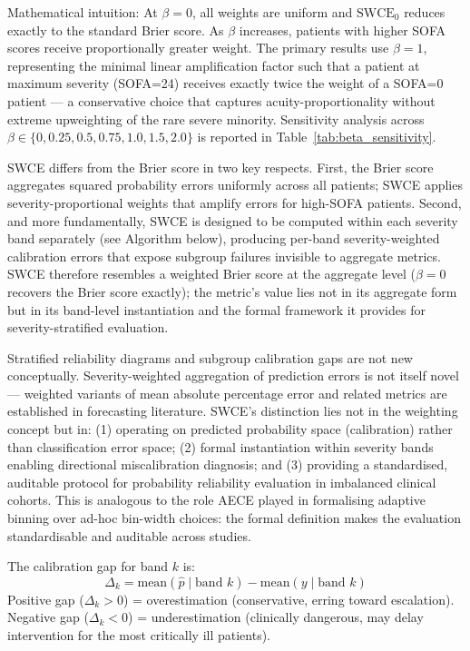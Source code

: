 \documentclass{ieeeaccess}
\begin{document}
Mathematical intuition: At $\beta=0$, all weights are uniform and $\text{SWCE}_0$ reduces exactly to the standard Brier score. As $\beta$ increases, patients with higher SOFA scores receive proportionally greater weight. The primary results use $\beta=1$, representing the minimal linear amplification factor such that a patient at maximum severity (SOFA=24) receives exactly twice the weight of a SOFA=0 patient — a conservative choice that captures acuity-proportionality without extreme upweighting of the rare severe minority. Sensitivity analysis across $\beta \in \{0, 0.25, 0.5, 0.75, 1.0, 1.5, 2.0\}$ is reported in Table~\ref{tab:beta_sensitivity}.

SWCE differs from the Brier score in two key respects. First, the Brier score aggregates squared probability errors uniformly across all patients; SWCE applies severity-proportional weights that amplify errors for high-SOFA patients. Second, and more fundamentally, SWCE is designed to be computed within each severity band separately (see Algorithm below), producing per-band severity-weighted calibration errors that expose subgroup failures invisible to aggregate metrics. SWCE therefore resembles a weighted Brier score at the aggregate level ($\beta=0$ recovers the Brier score exactly); the metric's value lies not in its aggregate form but in its band-level instantiation and the formal framework it provides for severity-stratified evaluation.

Stratified reliability diagrams and subgroup calibration gaps are not new conceptually. Severity-weighted aggregation of prediction errors is not itself novel — weighted variants of mean absolute percentage error and related metrics are established in forecasting literature. SWCE's distinction lies not in the weighting concept but in: (1) operating on predicted probability space (calibration) rather than classification error space; (2) formal instantiation within severity bands enabling directional miscalibration diagnosis; and (3) providing a standardised, auditable protocol for probability reliability evaluation in imbalanced clinical cohorts. This is analogous to the role AECE played in formalising adaptive binning over ad-hoc bin-width choices: the formal definition makes the evaluation standardisable and auditable across studies.

The calibration gap for band $k$ is:
\begin{equation}
\Delta_k = \text{mean}(\hat{p} \mid \text{band } k) - \text{mean}(y \mid \text{band } k)
\label{eq:gap}
\end{equation}
Positive gap ($\Delta_k > 0$) = overestimation (conservative, erring toward escalation). Negative gap ($\Delta_k < 0$) = underestimation (clinically dangerous, may delay intervention for the most critically ill patients).
\end{document}
